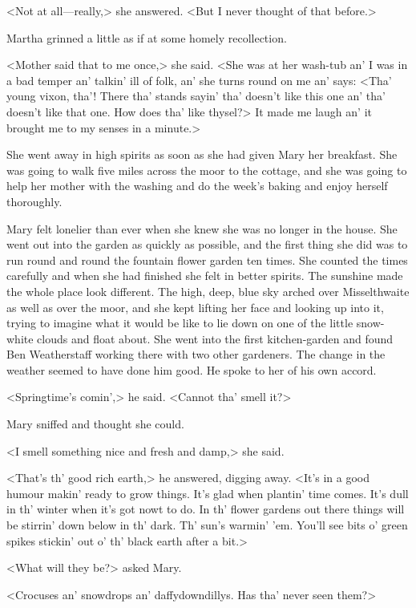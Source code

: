 <Not at all—really,> she answered. <But I never thought of that before.>

Martha grinned a little as if at some homely recollection.

<Mother said that to me once,> she said. <She was at her wash-tub an' I was in a bad temper an' talkin' ill of folk, an' she turns round on me an' says: <Tha' young vixon, tha'! There tha' stands sayin' tha' doesn't like this one an' tha' doesn't like that one. How does tha' like thysel?> It made me laugh an' it brought me to my senses in a minute.>

She went away in high spirits as soon as she had given Mary her breakfast. She was going to walk five miles across the moor to the cottage, and she was going to help her mother with the washing and do the week's baking and enjoy herself thoroughly.

Mary felt lonelier than ever when she knew she was no longer in the house. She went out into the garden as quickly as possible, and the first thing she did was to run round and round the fountain flower garden ten times. She counted the times carefully and when she had finished she felt in better spirits. The sunshine made the whole place look different. The high, deep, blue sky arched over Misselthwaite as well as over the moor, and she kept lifting her face and looking up into it, trying to imagine what it would be like to lie down on one of the little snow-white clouds and float about. She went into the first kitchen-garden and found Ben Weatherstaff working there with two other gardeners. The change in the weather seemed to have done him good. He spoke to her of his own accord.

<Springtime's comin',> he said. <Cannot tha' smell it?>

Mary sniffed and thought she could.

<I smell something nice and fresh and damp,> she said.

<That's th' good rich earth,> he answered, digging away. <It's in a good humour makin' ready to grow things. It's glad when plantin' time comes. It's dull in th' winter when it's got nowt to do. In th' flower gardens out there things will be stirrin' down below in th' dark. Th' sun's warmin' 'em. You'll see bits o' green spikes stickin' out o' th' black earth after a bit.>

<What will they be?> asked Mary.

<Crocuses an' snowdrops an' daffydowndillys. Has tha' never seen them?>

